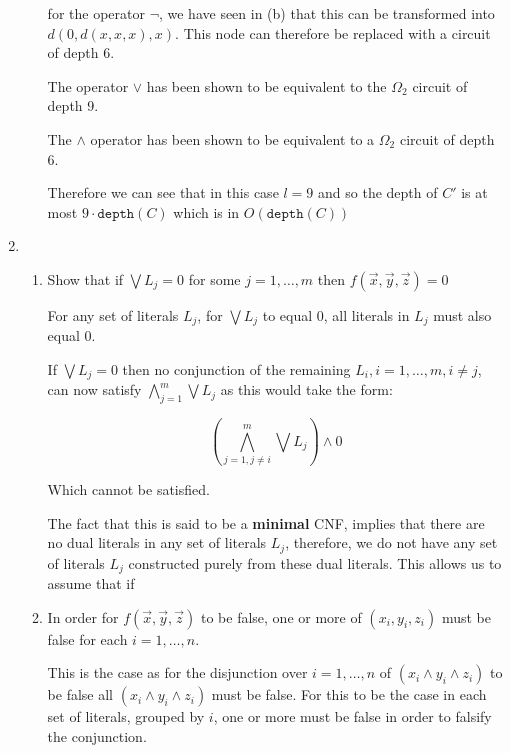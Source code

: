 \documentclass{article}
\begin{document}
\begin{enumerate}
\begin{enumerate}
        for the operator \(\neg\), we have seen in (b) that this can be transformed into $d(0,d(x,x,x),x)$. This node can therefore be replaced with a circuit of depth 6.

        The operator $\vee$ has been shown to be equivalent to the \(\Omega_{2}\) circuit of depth 9.

        The \(\wedge\) operator has been shown to be equivalent to a \(\Omega_{2}\) circuit of depth 6.

        Therefore we can see that in this case $l = 9$ and so the depth of $C'$ is at most $9 \cdot \texttt{depth} (C)$ which is in $O(\texttt{depth} (C))$


        \end{enumerate}
  \item

        \begin{enumerate}
          \item Show that if $\bigvee L_{j} = 0$  for some $j = 1, \ldots ,m$ then $f(\vec{x}, \vec{y}, \vec{z}) = 0$

                For any set of literals $L_{j}$, for $\bigvee L_{j}$ to equal 0, all literals in $L_{j}$ must also equal 0.

                If $\bigvee L_{j}=0$ then no conjunction of the remaining $L_{i}, i=1,\ldots,m, i \neq j$, can now satisfy $\bigwedge_{j=1}^{m}\bigvee L_{j}$ as this would take the form:

                \[
                (\bigwedge_{j=1, j\neq i}^{m}\bigvee L_{j})\wedge 0
                \]

                Which cannot be satisfied.

                The fact that this is said to be a \textbf{minimal} CNF, implies that there are no dual literals in any set of literals $L_{j}$, therefore, we do not have any set of literals $L_{j}$ constructed purely from these dual literals. This allows us to assume that if

          \item In order for $f(\vec{x}, \vec{y}, \vec{z})$ to be false, one or more of $(x_{i},y_{i},z_{i})$ must be false for each $i = 1,\ldots,n$.

                This is the case as for the disjunction over $i=1,\ldots,n$  of $(x_{i}\wedge y_{i}\wedge z_{i})$ to be false all $(x_{i}\wedge y_{i}\wedge z_{i})$ must be false. For this to be the case in each set of literals, grouped by $i$, one or more must be false in order to falsify the conjunction.




\end{enumerate}
\end{enumerate}
\end{document}

